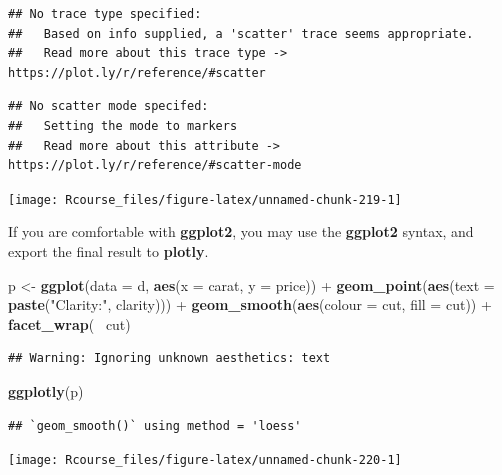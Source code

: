 \documentclass[]{book}
\newenvironment{Shaded}{\begin{snugshade}}{\end{snugshade}}
\newcommand{\KeywordTok}[1]{\textcolor[rgb]{0.13,0.29,0.53}{\textbf{{#1}}}}
\newcommand{\DataTypeTok}[1]{\textcolor[rgb]{0.13,0.29,0.53}{{#1}}}
\newcommand{\StringTok}[1]{\textcolor[rgb]{0.31,0.60,0.02}{{#1}}}
\newcommand{\NormalTok}[1]{{#1}}
\theoremstyle{definition}
\theoremstyle{definition}
\theoremstyle{remark}
\begin{document}
\begin{verbatim}
## No trace type specified:
##   Based on info supplied, a 'scatter' trace seems appropriate.
##   Read more about this trace type -> https://plot.ly/r/reference/#scatter
\end{verbatim}

\begin{verbatim}
## No scatter mode specifed:
##   Setting the mode to markers
##   Read more about this attribute -> https://plot.ly/r/reference/#scatter-mode
\end{verbatim}

\texttt{[image: Rcourse\_files/figure-latex/unnamed-chunk-219-1]}

If you are comfortable with \textbf{ggplot2}, you may use the
\textbf{ggplot2} syntax, and export the final result to \textbf{plotly}.

\begin{Shaded}
\begin{Highlighting}[]
\NormalTok{p <-}\StringTok{ }\KeywordTok{ggplot}\NormalTok{(}\DataTypeTok{data =} \NormalTok{d, }\KeywordTok{aes}\NormalTok{(}\DataTypeTok{x =} \NormalTok{carat, }\DataTypeTok{y =} \NormalTok{price)) +}
\StringTok{  }\KeywordTok{geom_point}\NormalTok{(}\KeywordTok{aes}\NormalTok{(}\DataTypeTok{text =} \KeywordTok{paste}\NormalTok{(}\StringTok{"Clarity:"}\NormalTok{, clarity))) +}
\StringTok{  }\KeywordTok{geom_smooth}\NormalTok{(}\KeywordTok{aes}\NormalTok{(}\DataTypeTok{colour =} \NormalTok{cut, }\DataTypeTok{fill =} \NormalTok{cut)) +}\StringTok{ }\KeywordTok{facet_wrap}\NormalTok{(~}\StringTok{ }\NormalTok{cut)}
\end{Highlighting}
\end{Shaded}

\begin{verbatim}
## Warning: Ignoring unknown aesthetics: text
\end{verbatim}

\begin{Shaded}
\begin{Highlighting}[]
\KeywordTok{ggplotly}\NormalTok{(p)}
\end{Highlighting}
\end{Shaded}

\begin{verbatim}
## `geom_smooth()` using method = 'loess'
\end{verbatim}

\texttt{[image: Rcourse\_files/figure-latex/unnamed-chunk-220-1]}
\end{document}
